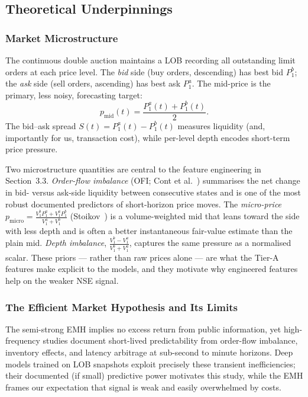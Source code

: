 \documentclass[11pt]{article}
\begin{document}
\subsection{Theoretical Underpinnings}
\subsubsection{Market Microstructure}
The continuous double auction maintains a LOB recording all outstanding limit orders at each price level.
The \emph{bid} side (buy orders, descending) has best bid $P_1^b$; the \emph{ask} side (sell orders,
ascending) has best ask $P_1^a$. The mid-price is the primary, less noisy, forecasting target:
\begin{equation}
p_{\mathrm{mid}}(t) = \frac{P_1^a(t) + P_1^b(t)}{2}.
\end{equation}
The bid--ask spread $S(t) = P_1^a(t) - P_1^b(t)$ measures liquidity (and, importantly for us, transaction
cost), while per-level depth encodes short-term price pressure.

Two microstructure quantities are central to the feature engineering in Section~3.3. \emph{Order-flow
imbalance} (OFI; Cont et al.~\cite{ofi}) summarises the net change in bid- versus ask-side liquidity between consecutive
states and is one of the most robust documented predictors of short-horizon price moves. The \emph{micro-price}
$p_{\mathrm{micro}} = \frac{V_1^b P_1^a + V_1^a P_1^b}{V_1^a + V_1^b}$ (Stoikov~\cite{microprice}) is a volume-weighted mid that
leans toward the side with less depth and is often a better instantaneous fair-value estimate than the plain
mid. \emph{Depth imbalance}, $\frac{V_1^b - V_1^a}{V_1^b + V_1^a}$, captures the same pressure as a normalised
scalar. These priors --- rather than raw prices alone --- are what the Tier-A features make explicit to the
models, and they motivate why engineered features help on the weaker NSE signal.

\subsubsection{The Efficient Market Hypothesis and Its Limits}
The semi-strong EMH implies no excess return from public information, yet high-frequency studies document
short-lived predictability from order-flow imbalance, inventory effects, and latency arbitrage at
sub-second to minute horizons. Deep models trained on LOB snapshots exploit precisely these transient
inefficiencies; their documented (if small) predictive power motivates this study, while the EMH frames
our expectation that signal is weak and easily overwhelmed by costs.
\end{document}
